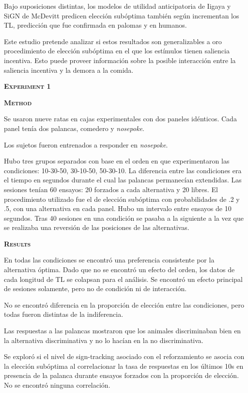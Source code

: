 \documentclass[a4paper,12pt]{article}
\begin{document}
Bajo suposiciones distintas, los modelos de utilidad anticipatoria de Iigaya y SiGN de McDevitt predicen elección subóptima también según incrementan los TL, predicción que fue confirmada en palomas y en humanos.

Este estudio pretende analizar si estos resultados son generalizables a oro procedimiento de elección subóptima en el que los estímulos tienen saliencia incentiva. Esto puede proveer información sobre la posible interacción entre la saliencia incentiva y la demora a la comida.

{\scshape\bfseries Experiment 1}

{\scshape\bfseries Method}

Se usaron nueve ratas en cajas experimentales con dos paneles idénticos. Cada panel tenía dos palancas, comedero y {\itshape nosepoke}.

Los sujetos fueron entrenados a responder en {\itshape nosepoke}.

Hubo tres grupos separados con base en el orden en que experimentaron las condiciones: 10-30-50, 30-10-50, 50-30-10. La diferencia entre las condiciones era el tiempo en segundos durante el cual las palancas permanecían extendidas. Las sesiones tenían 60 ensayos: 20 forzados a cada alternativa y 20 libres. El procedimiento utilizado fue el de elección subóptima con probabilidades de .2 y .5, con una alternativa en cada panel. Hubo un intervalo entre ensayos de 10 segundos. Tras 40 sesiones en una condición se pasaba a la siguiente a la vez que se realizaba una reversión de las posiciones de las alternativas.

{\scshape\bfseries Results}

En todas las condiciones se encontró una preferencia consistente por la alternativa óptima. Dado que no se encontró un efecto del orden, los datos de cada longitud de TL se colapsan para el análisis. Se encontró un efecto principal de sesiones solamente, pero no de condición ni de interacción.

No se encontró diferencia en la proporción de elección entre las condiciones, pero todas fueron distintas de la indiferencia.

Las respuestas a las palancas mostraron que los animales discriminaban bien en la alternativa discriminativa y no lo hacían en la no discriminativa.

Se exploró si el nivel de sign-tracking asociado con el reforzamiento se asocia con la elección subóptima al correlacionar la tasa de respuestas en los últimos 10s en presencia de la palanca durante ensayos forzados con la proporción de elección. No se encontró ninguna correlación.
\end{document}
